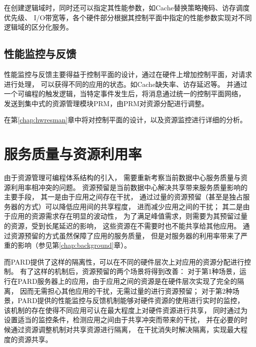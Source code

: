 在创建逻辑域时，同时还可以指定其性能参数，如Cache替换策略掩码、访存调度优先级、
I/O带宽等，各个硬件部分根据其控制平面中指定的性能参数实现对不同逻辑域的区分化服务。



\subsection{性能监控与反馈}

性能监控与反馈主要得益于控制平面的设计，通过在硬件上增加控制平面，对请求进行处理，
可以获得不同的应用的状态。如Cache缺失率、访存延迟等。
并通过一个可编程的触发逻辑，当特定事件发生后，将消息通过统一的控制平面网络，
发送到集中式的资源管理模块PRM，由PRM对资源分配进行调整。

在第\ref{chap:hwresman}章中将对控制平面的设计，以及资源监控进行详细的分析。


\fi


\section{服务质量与资源利用率}

由于资源管理可编程体系结构的引入，
需要重新考察当前数据中心服务质量与资源利用率相冲突的问题。
资源预留是当前数据中心解决共享带来服务质量影响的主要手段，
其一是由于应用之间存在干扰，
通过过量的资源预留（甚至是独占服务器的方式）可以降低应用间的共享程度，
进而减少应用之间的干扰；
其二是由于应用的资源需求存在明显的波动性，
为了满足峰值需求，则需要为其预留过量的资源，受到长尾延迟的影响，
这些资源在不需要时也不能共享给其他应用。
通过资源预留的方式虽然保障了应用的服务质量，
但是对服务器的利用率带来了严重的影响（参见第\ref{chap:background}章）。


而PARD提供了这样的隔离性，可以在不同的硬件层次上对应用的资源分配进行控制。
有了这样的机制后，资源预留的两个场景将得到改善：
对于第1种场景，运行在PARD服务器上的应用，由于应用之间的资源是在硬件层次实现了完全的隔离，
因而无需担心其他应用的干扰，无需过量的进行资源预留；
对于第2种场景，PARD提供的性能监控与反馈机制能够对硬件资源的使用进行实时的监控，
该机制的存在使得不同应用可认在最大程度上对硬件资源进行共享，
同时通过为设置适当的监控条件，检测应用之间由于共享冲突而带来的干扰， 
并在必要的时候通过资源调整机制对共享资源进行隔离，
在干扰消失时解决隔离，实现最大程度的资源共享。


